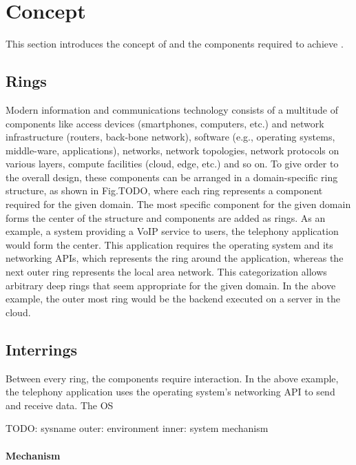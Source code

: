\section{Concept}
\label{sec:design}

This section introduces the concept of \mm and the components required to achieve \mm.

\subsection{Rings}
Modern information and communications technology consists of a multitude of components like access devices (smartphones, computers, etc.) and network infrastructure (routers, back-bone network), software (e.g., operating systems, middle-ware, applications), networks, network topologies, network protocols on various layers, compute facilities (cloud, edge, etc.) and so on.
To give order to the overall design, these components can be arranged in a domain-specific ring structure, as shown in Fig.TODO, where each ring represents a component required for the given domain.
The most specific component for the given domain forms the center of the structure and components are added as rings.
As an example, a system providing a VoIP service to users, the telephony application would form the center.
This application requires the operating system and its networking APIs, which represents the ring around the application, whereas the next outer ring represents the local area network.
This categorization allows arbitrary deep rings that seem appropriate for the given domain.
In the above example, the outer most ring would be the backend executed on a server in the cloud.


\subsection{Interrings}
Between every ring, the components require interaction.
In the above example, the telephony application uses the operating system's networking API to send and receive data.
The OS 

TODO:
sysname
outer: environment
inner: system
mechanism








\paragraph{Mechanism}

